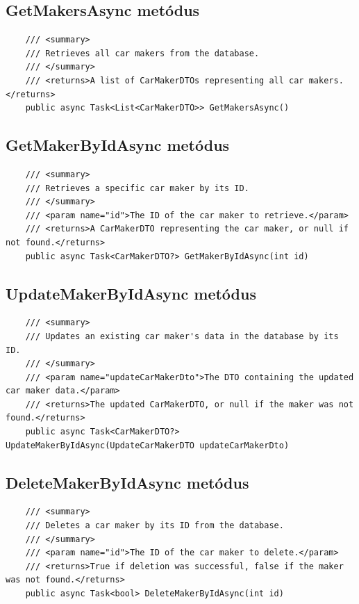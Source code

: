 \documentclass{report}[11pt]
\begin{document}
\subsection*{GetMakersAsync metódus}
\begin{lstlisting}
    /// <summary>
    /// Retrieves all car makers from the database.
    /// </summary>
    /// <returns>A list of CarMakerDTOs representing all car makers.</returns>
    public async Task<List<CarMakerDTO>> GetMakersAsync()
\end{lstlisting}

\subsection*{GetMakerByIdAsync metódus}
\begin{lstlisting}
    /// <summary>
    /// Retrieves a specific car maker by its ID.
    /// </summary>
    /// <param name="id">The ID of the car maker to retrieve.</param>
    /// <returns>A CarMakerDTO representing the car maker, or null if not found.</returns>
    public async Task<CarMakerDTO?> GetMakerByIdAsync(int id)
\end{lstlisting}

\subsection*{UpdateMakerByIdAsync metódus}
\begin{lstlisting}
    /// <summary>
    /// Updates an existing car maker's data in the database by its ID.
    /// </summary>
    /// <param name="updateCarMakerDto">The DTO containing the updated car maker data.</param>
    /// <returns>The updated CarMakerDTO, or null if the maker was not found.</returns>
    public async Task<CarMakerDTO?> UpdateMakerByIdAsync(UpdateCarMakerDTO updateCarMakerDto)
\end{lstlisting}

\subsection*{DeleteMakerByIdAsync metódus}
\begin{lstlisting}
    /// <summary>
    /// Deletes a car maker by its ID from the database.
    /// </summary>
    /// <param name="id">The ID of the car maker to delete.</param>
    /// <returns>True if deletion was successful, false if the maker was not found.</returns>
    public async Task<bool> DeleteMakerByIdAsync(int id)
\end{lstlisting}
\end{document}
